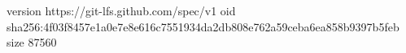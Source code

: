 version https://git-lfs.github.com/spec/v1
oid sha256:4f03f8457e1a0e7e8e616c7551934da2db808e762a59ceba6ea858b9397b5feb
size 87560
